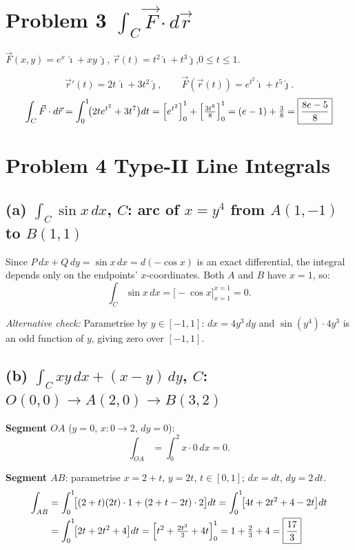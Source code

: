 \documentclass[12pt]{article}
\begin{document}
\section*{Problem 3 \quad $\displaystyle\int_C\vec{F}\cdot d\vec{r}$}

$\vec{F}(x,y)=e^x\,\hat{\imath}+xy\,\hat{\jmath}$,\quad
$\vec{r}(t)=t^2\hat{\imath}+t^3\hat{\jmath}$,\quad $0\le t\le1$.

\[
  \vec{r}'(t)=2t\,\hat{\imath}+3t^2\hat{\jmath},\qquad
  \vec{F}(\vec{r}(t))=e^{t^2}\hat{\imath}+t^5\hat{\jmath}.
\]
\[
  \int_C\vec{F}\cdot d\vec{r}
  =\int_0^1\!\bigl(2te^{t^2}+3t^7\bigr)dt
  =\Bigl[e^{t^2}\Bigr]_0^1+\Bigl[\tfrac{3t^8}{8}\Bigr]_0^1
  =(e-1)+\tfrac{3}{8}
  =\boxed{\dfrac{8e-5}{8}}
\]

\section*{Problem 4 \quad Type-II Line Integrals}

\subsection*{(a) $\displaystyle\int_C\sin x\,dx$,\quad
  $C$: arc of $x=y^4$ from $A(1,-1)$ to $B(1,1)$}

Since $P\,dx+Q\,dy=\sin x\,dx=d(-\cos x)$ is an exact differential, the integral depends only on the endpoints' $x$-coordinates.  Both $A$ and $B$ have $x=1$, so:
\[
  \int_C\sin x\,dx=\bigl[-\cos x\bigr]_{x=1}^{x=1}=\boxed{0}.
\]

\textit{Alternative check:}  Parametrise by $y\in[-1,1]$: $dx=4y^3\,dy$ and
$\sin(y^4)\cdot4y^3$ is an odd function of $y$, giving zero over $[-1,1]$.

\subsection*{(b) $\displaystyle\int_C xy\,dx+(x-y)\,dy$,\quad
  $C$: $O(0,0)\to A(2,0)\to B(3,2)$}

\textbf{Segment $OA$} ($y=0$, $x:0\to2$, $dy=0$):
\[
  \int_{OA}=\int_0^2 x\cdot0\,dx=0.
\]

\textbf{Segment $AB$}: parametrise $x=2+t$, $y=2t$, $t\in[0,1]$; $dx=dt$, $dy=2\,dt$.
\begin{align*}
  \int_{AB}
  &=\int_0^1\!\bigl[(2+t)(2t)\cdot1+(2+t-2t)\cdot2\bigr]dt
   =\int_0^1\!\bigl[4t+2t^2+4-2t\bigr]dt\\
  &=\int_0^1\!\bigl[2t+2t^2+4\bigr]dt
   =\Bigl[t^2+\tfrac{2t^3}{3}+4t\Bigr]_0^1
   =1+\tfrac{2}{3}+4=\boxed{\dfrac{17}{3}}
\end{align*}
\end{document}
